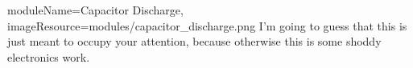 \begin{needymodule}{
  moduleName=Capacitor Discharge,
  imageResource=modules/capacitor_discharge.png
}
{
  I'm going to guess that this is just meant to occupy your attention, because otherwise this is some shoddy electronics work.
}
  \begin{bulletlist}
  \end{bulletlist}

\end{needymodule}
